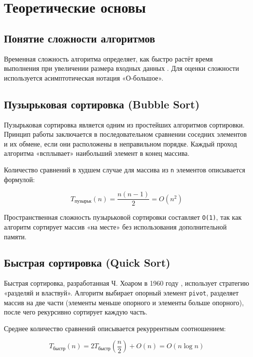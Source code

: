 \section{Теоретические основы}

\subsection{Понятие сложности алгоритмов}

Временная сложность алгоритма определяет, как быстро растёт время выполнения при увеличении размера входных данных \cite{knuth1998art}. Для оценки сложности используется асимптотическая нотация «О-большое».

\subsection{Пузырьковая сортировка (Bubble Sort)}

Пузырьковая сортировка является одним из простейших алгоритмов сортировки. Принцип работы заключается в последовательном сравнении соседних элементов и их обмене, если они расположены в неправильном порядке. Каждый проход алгоритма «всплывает» наибольший элемент в конец массива.

Количество сравнений в худшем случае для массива из \texttt{n} элементов описывается формулой:

\begin{equation}
\label{eq:bubble}
T_{\text{пузырьк}}(n) = \frac{n(n-1)}{2} = O(n^2)
\end{equation}

Пространственная сложность пузырьковой сортировки составляет \texttt{O(1)}, так как алгоритм сортирует массив «на месте» без использования дополнительной памяти.

\subsection{Быстрая сортировка (Quick Sort)}

Быстрая сортировка, разработанная Ч. Хоаром в 1960 году \cite{hoare1962quicksort}, использует стратегию «разделяй и властвуй». Алгоритм выбирает опорный элемент \texttt{pivot}, разделяет массив на две части (элементы меньше опорного и элементы больше опорного), после чего рекурсивно сортирует каждую часть.

Среднее количество сравнений описывается рекуррентным соотношением:

\begin{equation}
\label{eq:quick}
T_{\text{быстр}}(n) = 2T_{\text{быстр}}\left(\frac{n}{2}\right) + O(n) = O(n \log n)
\end{equation}

